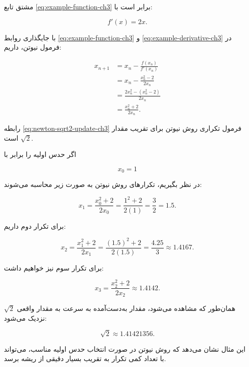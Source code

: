 مشتق تابع \eqref{eq:example-function-ch3} برابر است با:

\begin{equation}
f'(x)=2x.
\label{eq:example-derivative-ch3}
\end{equation}

با جایگذاری روابط \eqref{eq:example-function-ch3} و \eqref{eq:example-derivative-ch3} در فرمول نیوتن، داریم:

\begin{align}
x_{n+1}
&=x_n-\frac{f(x_n)}{f'(x_n)}
\nonumber\\
&=x_n-\frac{x_n^2-2}{2x_n}
\nonumber\\
&=\frac{2x_n^2-(x_n^2-2)}{2x_n}
\nonumber\\
&=\frac{x_n^2+2}{2x_n}.
\label{eq:newton-sqrt2-update-ch3}
\end{align}

رابطه \eqref{eq:newton-sqrt2-update-ch3} فرمول تکراری روش نیوتن برای تقریب مقدار \(\sqrt{2}\) است.

اگر حدس اولیه را برابر با

\begin{equation}
x_0=1
\label{eq:initial-guess-ch3}
\end{equation}

در نظر بگیریم، تکرارهای روش نیوتن به صورت زیر محاسبه می‌شوند:

\begin{equation}
x_1=\frac{x_0^2+2}{2x_0}
=\frac{1^2+2}{2(1)}
=\frac{3}{2}
=1.5.
\label{eq:x1-ch3}
\end{equation}

برای تکرار دوم داریم:

\begin{equation}
x_2=\frac{x_1^2+2}{2x_1}
=\frac{(1.5)^2+2}{2(1.5)}
=\frac{4.25}{3}
\approx 1.4167.
\label{eq:x2-ch3}
\end{equation}

برای تکرار سوم نیز خواهیم داشت:

\begin{equation}
x_3=\frac{x_2^2+2}{2x_2}
\approx 1.4142.
\label{eq:x3-ch3}
\end{equation}

همان‌طور که مشاهده می‌شود، مقدار به‌دست‌آمده به سرعت به مقدار واقعی \(\sqrt{2}\) نزدیک می‌شود:

\begin{equation}
\sqrt{2}\approx 1.41421356.
\label{eq:sqrt2-value-ch3}
\end{equation}

این مثال نشان می‌دهد که روش نیوتن در صورت انتخاب حدس اولیه مناسب، می‌تواند با تعداد کمی تکرار به تقریب بسیار دقیقی از ریشه برسد.

